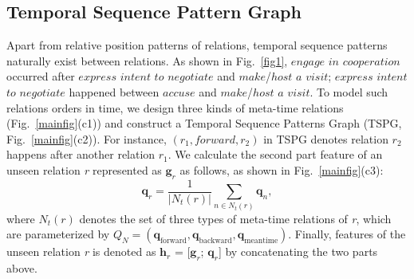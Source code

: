 \documentclass[sigconf]{acmart}
\begin{document}
\subsection{Temporal Sequence Pattern Graph}
\par
Apart from relative position patterns of relations, temporal sequence patterns naturally exist between relations. As shown in Fig.~\ref{fig1}, $ {engage}$ $ {in}$ $ {cooperation}$ occurred after $ {express}$ $ {intent}$ $ {to}$ $ {negotiate}$ and $ {make}$/$ {host}$ $ {a}$ $ {visit}$; $ {express}$ $ {intent}$ $ {to}$ $ {negotiate}$ happened between $ {accuse}$ and $ {make}$/$ {host}$ $ {a}$ $ {visit}$. 
To model such relations orders in time, we design three kinds of meta-time relations (Fig.~\ref{mainfig}(c1)) and construct a Temporal Sequence Patterns Graph (TSPG, Fig.~\ref{mainfig}(c2)). For instance, $\left(r_{1}, forward, r_{2}\right)$ in TSPG denotes relation $r_{2} $ happens after another relation $r_{1} $. 
We calculate the second part feature of an unseen relation \emph{r} represented as $\mathbf{g}_{r}$ as follows, as shown in Fig.~\ref{mainfig}(c3):
\begin{equation}
\mathbf{q}_{r}=\frac{1}{| {N}_{t}(r)|} \sum_{n \in  {N}_{t}(r)} \mathbf{q}_{n},
\end{equation}
where $ {N}_{t}(r)$ denotes the set of three types of meta-time relations of \emph{r}, which are parameterized by $ {Q}_{N}=\left( \mathbf{q}_{\mathrm{forward}}, \mathbf{q}_{\mathrm{backward}}, \mathbf{q}_{\mathrm{meantime}} \right)$. Finally, features of the unseen relation \emph{r} is denoted as $\mathbf{h}_{r}$ = [$\mathbf{g}_{r}$; $\mathbf{q}_{r}$] by concatenating the two parts above. 
\end{document}

